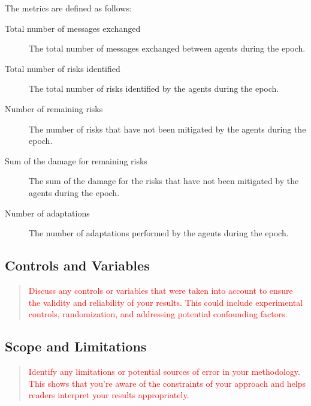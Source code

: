 The metrics are defined as follows:

\begin{description}
    \item[Total number of messages exchanged] The total number of messages exchanged between agents during the epoch.
    \item[Total number of risks identified] The total number of risks identified by the agents during the epoch.
    \item[Number of remaining risks] The number of risks that have not been mitigated by the agents during the epoch.
    \item[Sum of the damage for remaining risks] The sum of the damage for the risks that have not been mitigated by the agents during the epoch.
    \item[Number of adaptations] The number of adaptations performed by the agents during the epoch.
\end{description}

\subsection{Controls and Variables}
\label{ssec:controls-variables}
\begin{quote}\textcolor{red}{
    Discuss any controls or variables that were taken into account to ensure the validity and reliability of your results. This could include experimental controls, randomization, and addressing potential confounding factors.
}\end{quote}

\subsection{Scope and Limitations}
\label{ssec:scope-limitations}
\begin{quote}\textcolor{red}{
    Identify any limitations or potential sources of error in your methodology. This shows that you're aware of the constraints of your approach and helps readers interpret your results appropriately.
}\end{quote}
